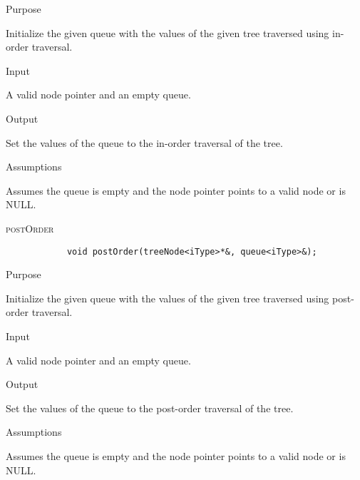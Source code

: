 \documentclass[pdftex, 12pt]{article}
\begin{document}
\begin{description}
\begin{description}
		\item{Purpose}
			
			Initialize the given queue with the values of the given tree traversed using in-order traversal.

		\item{Input}

			A valid node pointer and an empty queue.

		\item{Output}

			Set the values of the queue to the in-order traversal of the tree.

		\item{Assumptions}

			Assumes the queue is empty and the node pointer points to a valid node or is NULL.

		\end{description}
	\item{\textsc{postOrder}}
		\begin{lstlisting}
			void postOrder(treeNode<iType>*&, queue<iType>&);
		\end{lstlisting}
		\begin{description}

		\item{Purpose}
			
			Initialize the given queue with the values of the given tree traversed using post-order traversal.

		\item{Input}

			A valid node pointer and an empty queue.

		\item{Output}

			Set the values of the queue to the post-order traversal of the tree.

		\item{Assumptions}

			Assumes the queue is empty and the node pointer points to a valid node or is NULL.

		\end{description}

\end{description}
\end{document}
